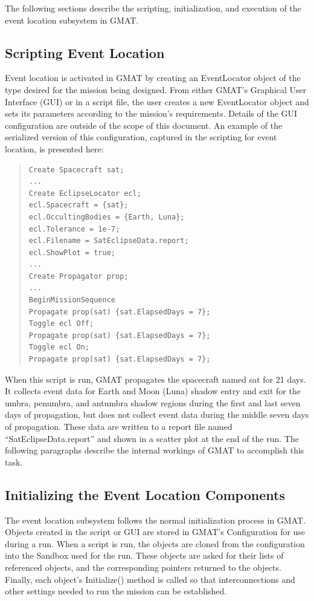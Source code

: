 \documentclass[letterpaper,10pt]{article}
\begin{document}
The following sections describe the scripting, initialization, and execution of
the event location subsystem in GMAT.

\subsection{Scripting Event Location}

Event location is activated in GMAT by creating an EventLocator object of the
type desired for the mission being designed.  From either GMAT's Graphical User
Interface (GUI) or in a script file, the user creates a new EventLocator object
and sets its parameters according to the mission's requirements.  Details of the
GUI configuration are outside of the scope of this document.  An example of the
serialized version of this configuration, captured in the scripting for event
location, is presented here:

\begin{quote}
\begin{verbatim}
Create Spacecraft sat;
...
Create EclipseLocator ecl;
ecl.Spacecraft = {sat};
ecl.OccultingBodies = {Earth, Luna};
ecl.Tolerance = 1e-7;
ecl.Filename = SatEclipseData.report;
ecl.ShowPlot = true;
...
Create Propagator prop;
...
BeginMissionSequence
Propagate prop(sat) {sat.ElapsedDays = 7};
Toggle ecl Off;
Propagate prop(sat) {sat.ElapsedDays = 7};
Toggle ecl On;
Propagate prop(sat) {sat.ElapsedDays = 7};
\end{verbatim}
\end{quote}

\noindent When this script is run, GMAT propagates the spacecraft named sat for
21 days.  It collects event data for Earth and Moon (Luna) shadow entry and exit
for the umbra, penumbra, and antumbra shadow regions during the first and last
seven days of propagation, but does not collect event data during the middle
seven days of propagation.  These data are written to a report file named
``SatEclipseData.report'' and shown in a scatter plot at the end of the run. 
The following paragraphs describe the internal workings of GMAT to accomplish
this task. 

\subsection{Initializing the Event Location Components}

The event location subsystem follows the normal initialization process in GMAT.
 Objects created in the script or GUI are stored in GMAT's Configuration for
use during a run.  When a script is run, the objects are cloned from the
configuration into the Sandbox used for the run.  These objects are asked for
their lists of referenced objects, and the corresponding pointers returned to
the objects.  Finally, each object's Initialize() method is called so that
interconnections and other settings needed to run the mission can be
established.
\end{document}
